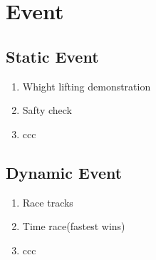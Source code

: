 
\chapter{Event}\label{chapter:Event}


\section{Static Event}
\begin{enumerate}
    \item Whight lifting demonstration
    \item Safty check
    \item ccc
  \end{enumerate}

  
\section{Dynamic Event}
\begin{enumerate}
    \item Race tracks
    \item Time race(fastest wins)
    \item ccc
  \end{enumerate}
